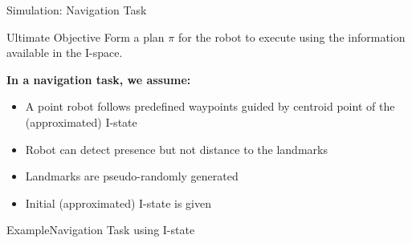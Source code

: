 \documentclass[10pt]{beamer}
\begin{document}
\begin{frame}{Simulation: Navigation Task}
 \begin{block}{Ultimate Objective} 
   Form a plan $\pi$ for the robot to execute using the information available in
   the I-space.
 \end{block}

\textbf{In a navigation task, we assume:}
\begin{itemize}
\item A point robot follows predefined waypoints guided by centroid point of the
  (approximated) I-state
\item Robot can detect presence but not distance to the landmarks
\item Landmarks are pseudo-randomly generated
\item Initial (approximated) I-state is given
\end{itemize}
\end{frame}

\begin{frame}{Example}{Navigation Task using I-state}
  \begin{center}
  \end{center}
\end{frame} 

\end{document}
